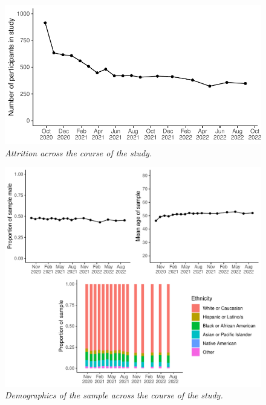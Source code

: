 \documentclass[
  man, donotrepeattitle,floatsintext]{apa6}
\begin{document}
\newpage



\begin{figure}
\centering
\includegraphics{manuscript_files/figure-latex/plotAttrition-1.pdf}
\caption{\label{fig:plotAttrition}\emph{Attrition across the course of the study.}}
\end{figure}

\newpage



\begin{figure}
\centering
\includegraphics{manuscript_files/figure-latex/plotAttritionBreakdown-1.pdf}
\caption{\label{fig:plotAttritionBreakdown}\emph{Demographics of the sample across the course of the study.}}
\end{figure}

\newpage
\end{document}
